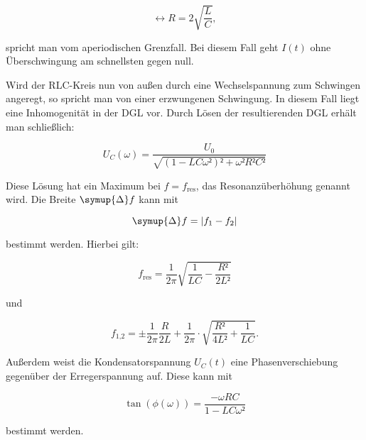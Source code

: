 \begin{equation}
\leftrightarrow R = 2\sqrt{\frac{L}{C}},
\label{eqn:apth}
\end{equation}

spricht man vom aperiodischen Grenzfall. Bei diesem Fall geht $I(t)$ ohne 
Überschwingung am schnellsten gegen null. 

Wird der RLC-Kreis nun von außen durch eine Wechselspannung zum Schwingen 
angeregt, so spricht man von einer erzwungenen Schwingung. In diesem Fall
liegt eine Inhomogenität in der DGL vor. Durch Lösen der resultierenden 
DGL erhält man schließlich: 

\begin{equation}
U_C(\omega) = \frac{U_0}{\sqrt{(1-LC\omega²)²+\omega²R²C²}}
\end{equation}

Diese Lösung hat ein Maximum bei $f = f_\text{res}$, das Resonanzüberhöhung
genannt wird. Die Breite $\symup{\Delta}f$ kann mit

\begin{equation}
\symup{\Delta} f = |f_1 - f_2|
\end{equation}

bestimmt werden. Hierbei gilt: 

\begin{equation}
f_\text{res} = \frac{1}{2\pi}\sqrt{\frac{1}{LC}-\frac{R²}{2L²}}
\label{eqn:fres}
\end{equation}

und 

\begin{equation}
f_\text{1,2} = \pm \frac{1}{2\pi} \frac{R}{2L}+ \frac{1}{2 \pi} \cdot \sqrt{\frac{R²}{4L²}+\frac{1}{LC}}.
\label{eqn:f12}
\end{equation}

Außerdem weist die Kondensatorspannung $U_C(t)$ eine Phasenverschiebung gegenüber
der Erregerspannung auf. Diese kann mit 

\begin{equation}
\tan({\phi(\omega)})=\frac{-\omega RC}{1-LC\omega²}
\end{equation}

bestimmt werden. 